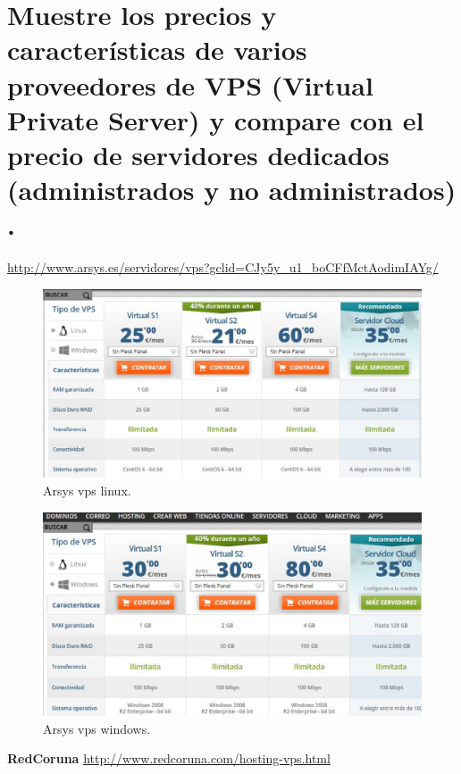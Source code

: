 \section{Muestre los precios y características de varios proveedores de VPS (Virtual Private Server) y compare con el precio de servidores dedicados (administrados y no administrados) .}
\url{http://www.arsys.es/servidores/vps?gclid=CJy5y_u1_boCFfMctAodimIAYg/}
\begin{figure}[H]
\begin{center}
\includegraphics[scale=0.4]{imagenes/cuestion2-1.eps}
\caption{ Arsys vps linux.}
\end{center}
\end{figure}

\begin{figure}[H]
\begin{center}
\includegraphics[scale=0.4]{imagenes/cuestion2-2.eps}
\caption{ Arsys vps windows.}
\end{center}
\end{figure}


\textbf{RedCoruna}
\url{http://www.redcoruna.com/hosting-vps.html}

